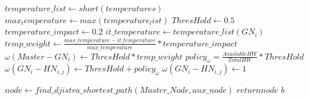 \begin{algorithm}
\caption{Temperature-Distributed algorithm}\label{alg:tempdistrib}
\begin{algorithmic}[1]
\State $temperature\_list\gets short(temperatures)$
\State $max_temperature\gets max(temperature_list)$
\State $ThresHold\gets 0.5$
\State $temperature\_impact \gets 0.2$
\State $it\_temperature \gets temperature\_list(GN_i)$
\State $temp\_weight \gets
\frac{max\_temperature-it\_temperature}
{max\_temperature}*temperature\_impact$
\State $\omega(Master-GN_i) \gets ThresHold*temp\_weight$
    \State $policy_\omega = \frac{Available HW}{Total HW}*ThresHold$
    \State $\omega(GN_i-HN_{i,j}) \gets ThresHold+policy_\omega$
\Else
    \State $\omega(GN_i - HN_{i,j}) \gets 1$
\EndIf

\EndFor
\EndFor
\State $node \gets find\_djistra\_shortest\_path(Master\_Node,
aux\_node)$
\State \textbf{$return node$} $b$
\EndProcedure
\end{algorithmic}
\end{algorithm}
